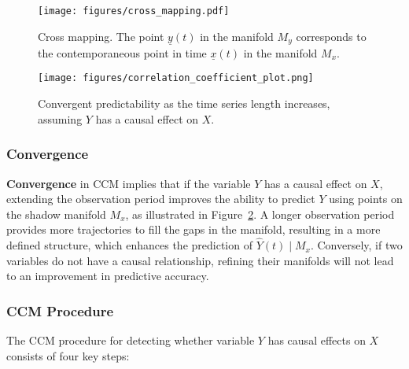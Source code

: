 \begin{figure}[t]
  \centering
  \texttt{[image: figures/cross\_mapping.pdf]} 
  \caption{Cross mapping. The point \( \underline{y}(t) \) in the manifold \( M_y \) corresponds to the contemporaneous point in time \( \underline{x}(t) \) in the manifold \( M_x \).}
  \label{fig:ccm_cross_mapping}
\end{figure}

\begin{figure}[t]
  \centering
  \texttt{[image: figures/correlation\_coefficient\_plot.png]} 
  \caption{Convergent predictability as the time series length increases, assuming $Y$ has a causal effect on $X$.
}
  \label{fig:ccm_convergence}
\end{figure}

\subsubsection{Convergence}
\textbf{Convergence} in CCM implies that if the variable \( Y \) has a causal effect on \( X \), extending the observation period improves the ability to predict \( Y \) using points on the shadow manifold \( M_x \), as illustrated in Figure~\ref{fig:ccm_convergence}. A longer observation period provides more trajectories to fill the gaps in the manifold, resulting in a more defined structure, which enhances the prediction of \( \hat{Y}(t) \mid M_x \). Conversely, if two variables do not have a causal relationship, refining their manifolds will not lead to an improvement in predictive accuracy.

\subsubsection{CCM Procedure}
\label{sec:ccm_procedure}
The CCM procedure for detecting whether variable \( Y \) has causal effects on \( X \) consists of four key steps:

